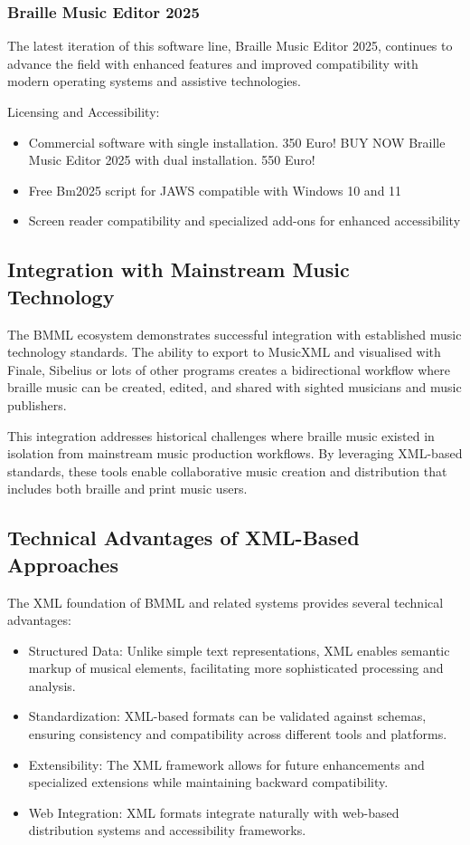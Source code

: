 \subsubsection{Braille Music Editor 2025}
The latest iteration of this software line, Braille Music Editor 2025, continues to advance the field with enhanced features and improved compatibility with modern operating systems and assistive technologies.

Licensing and Accessibility:
\begin{itemize}
    \item Commercial software with single installation. 350 Euro! BUY NOW Braille Music Editor 2025 with dual installation. 550 Euro!
    \item Free Bm2025 script for JAWS compatible with Windows 10 and 11
    \item Screen reader compatibility and specialized add-ons for enhanced accessibility
\end{itemize}

\subsection{Integration with Mainstream Music Technology}

The BMML ecosystem demonstrates successful integration with established music technology standards. The ability to export to MusicXML and visualised with Finale, Sibelius or lots of other programs creates a bidirectional workflow where braille music can be created, edited, and shared with sighted musicians and music publishers.

This integration addresses historical challenges where braille music existed in isolation from mainstream music production workflows. By leveraging XML-based standards, these tools enable collaborative music creation and distribution that includes both braille and print music users.

\subsection{Technical Advantages of XML-Based Approaches}

The XML foundation of BMML and related systems provides several technical advantages:

\begin{itemize}
    \item Structured Data: Unlike simple text representations, XML enables semantic markup of musical elements, facilitating more sophisticated processing and analysis.
    \item Standardization: XML-based formats can be validated against schemas, ensuring consistency and compatibility across different tools and platforms.
    \item Extensibility: The XML framework allows for future enhancements and specialized extensions while maintaining backward compatibility.
    \item Web Integration: XML formats integrate naturally with web-based distribution systems and accessibility frameworks.
\end{itemize}

